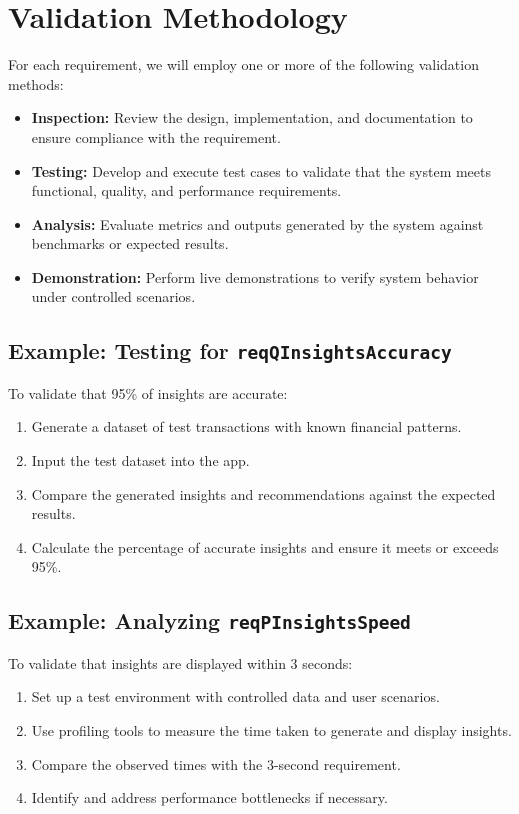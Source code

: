 \section{Validation Methodology}

For each requirement, we will employ one or more of the following validation methods:

\begin{itemize}
    \item \textbf{Inspection:} Review the design, implementation, and documentation to ensure compliance with the requirement.
    \item \textbf{Testing:} Develop and execute test cases to validate that the system meets functional, quality, and performance requirements.
    \item \textbf{Analysis:} Evaluate metrics and outputs generated by the system against benchmarks or expected results.
    \item \textbf{Demonstration:} Perform live demonstrations to verify system behavior under controlled scenarios.
\end{itemize}

\subsection{Example: Testing for \texttt{reqQInsightsAccuracy} }
To validate that 95\% of insights are accurate:
\begin{enumerate}
    \item Generate a dataset of test transactions with known financial patterns.
    \item Input the test dataset into the app.
    \item Compare the generated insights and recommendations against the expected results.
    \item Calculate the percentage of accurate insights and ensure it meets or exceeds 95\%.
\end{enumerate}

\subsection{Example: Analyzing \texttt{reqPInsightsSpeed} }
To validate that insights are displayed within 3 seconds:
\begin{enumerate}
    \item Set up a test environment with controlled data and user scenarios.
    \item Use profiling tools to measure the time taken to generate and display insights.
    \item Compare the observed times with the 3-second requirement.
    \item Identify and address performance bottlenecks if necessary.
\end{enumerate}

